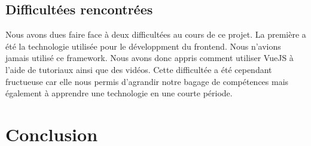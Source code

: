 \documentclass[a4paper,11pt, oneside]{book}
\begin{document}
\section{Difficultées rencontrées}

Nous avons dues faire face à deux difficultées au cours de ce projet. La première a été la technologie utilisée pour le développment du frontend. Nous n'avions jamais utilisé ce framework.
Nous avons donc appris comment utiliser VueJS à l'aide de tutoriaux ainsi que des vidéos. Cette difficultée a été cependant fructueuse car elle nous permis d'agrandir notre bagage de compétences
mais également à apprendre une technologie en une courte période.

\chapter{Conclusion}
\end{document}
